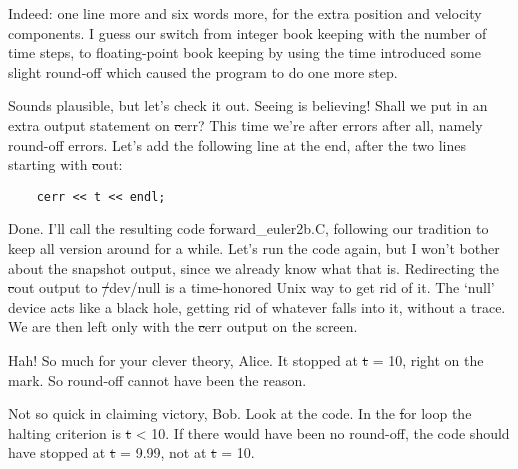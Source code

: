 \alice
Indeed: one line more and six words more, for the extra position and
velocity components.  I guess our switch from integer book keeping
with the number of time steps, to floating-point book keeping by using
the time introduced some slight round-off which caused the program to
do one more step.

\bob
Sounds plausible, but let's check it out.  Seeing is believing!
Shall we put in an extra output statement on {\st cerr}?  This time
we're after errors after all, namely round-off errors.  Let's add
the following line at the end, after the two lines starting with {\st
cout}:

\cba

\begin{small}
\begin{verbatim}
	cerr << t << endl;
\end{verbatim}
\end{small}

\abc

\carol
Done.  I'll call the resulting code {\st forward\_euler2b.C}, following
our tradition to keep all version around for a while.  Let's run the
code again, but I won't bother about the snapshot output, since we
already know what that is.  Redirecting the {\st cout} output to {\st
/dev/null} is a time-honored Unix way to get rid of it.  The `null'
device acts like a black hole, getting rid of whatever falls into it,
without a trace.  We are then left only with the {\st cerr} output on
the screen.

\cba

\abc

\bob
Hah!  So much for your clever theory, Alice.  It stopped at {\st t = 10},
right on the mark.  So round-off cannot have been the reason.

\alice
Not so quick in claiming victory, Bob.  Look at the code.  In the {\st for}
loop the halting criterion is {\st t < 10}.  If there would have been
no round-off, the code should have stopped at {\st t = 9.99}, not at
{\st t = 10}.

